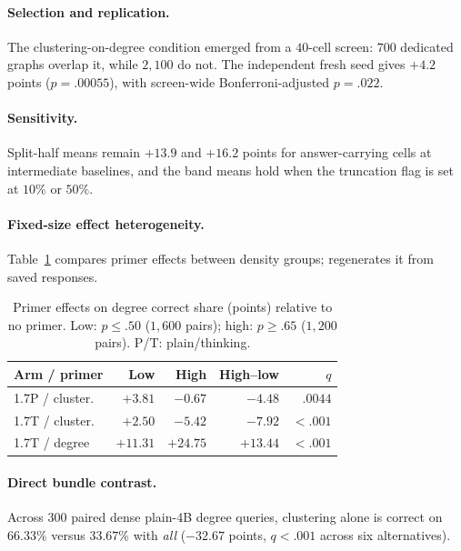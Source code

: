 \documentclass[11pt]{article}
\begin{document}
\paragraph{Selection and replication.} The clustering-on-degree condition emerged from a $40$-cell screen: $700$ dedicated graphs overlap it, while $2{,}100$ do not. %
The independent fresh seed gives $+4.2$ points ($p=.00055$), with screen-wide Bonferroni-adjusted $p=.022$. %

\paragraph{Sensitivity.} Split-half means remain $+13.9$ and $+16.2$ points for answer-carrying cells at intermediate baselines, %
and the band means hold when the truncation flag is set at $10\%$ or $50\%$. %

\paragraph{Fixed-size effect heterogeneity.} Table~\ref{tab:interactions} compares primer effects between density groups;  regenerates it from saved responses.

\begin{table}[t]
\centering\footnotesize
\setlength{\tabcolsep}{2.4pt}
\begin{tabular}{lrrrr}
\toprule
Arm / primer & Low & High & High--low & $q$\\
\midrule
1.7P / cluster. & $+3.81$ & $-0.67$ & $-4.48$ & $.0044$\\ %
1.7T / cluster. & $+2.50$ & $-5.42$ & $-7.92$ & $<.001$\\ %
1.7T / degree & $+11.31$ & $+24.75$ & $+13.44$ & $<.001$\\ %
\bottomrule
\end{tabular}
\caption{Primer effects on degree correct share (points) relative to no primer. Low: $p\leq .50$ ($1{,}600$ pairs); high: $p\geq .65$ ($1{,}200$ pairs). P/T: plain/thinking. %
}
\label{tab:interactions}
\end{table}

\paragraph{Direct bundle contrast.} Across $300$ paired dense plain-4B degree queries, clustering alone is correct on $66.33\%$ versus $33.67\%$ with \emph{all} ($-32.67$ points, $q<.001$ across six alternatives). %
\end{document}
